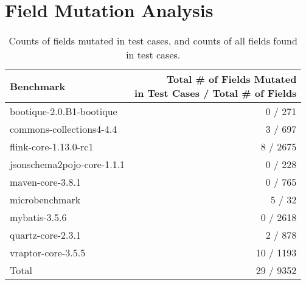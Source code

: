 \chapter{Field Mutation Analysis}
\label{AppendixA}

\begin{table*}[b]
	\centering
	\caption{Counts of fields mutated in test cases, and counts of all fields found in test cases.}
	\begin{tabular}{lr}
		\toprule
		Benchmark &  \thead{ Total \# of Fields Mutated \\ in Test Cases / Total \#  of Fields} \\
		\midrule
		bootique-2.0.B1-bootique           			&  0 / 271       \\
		commons-collections4-4.4           			&  3 / 697       \\
		flink-core-1.13.0-rc1           			&  8 / 2675       \\
		jsonschema2pojo-core-1.1.1           		&  0 / 228       \\
		maven-core-3.8.1           					&  0 / 765       \\
		microbenchmark           					&  5 / 32       \\
		mybatis-3.5.6           					&  0 / 2618       \\
		quartz-core-2.3.1           				&  2 / 878       \\
		vraptor-core-3.5.5           				&  10 / 1193       \\
		\bottomrule
		Total           							&  29 / 9352       \\
	\end{tabular}
	\label{tab:mutations}
\end{table*}